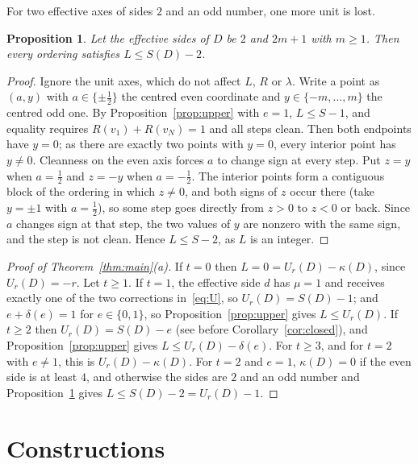 \documentclass[11pt]{article}
\newtheorem{proposition}{Proposition}
\theoremstyle{remark}
\begin{document}
For two effective axes of sides $2$ and an odd number, one more unit is lost.

\begin{proposition}\label{prop:narrow}
Let the effective sides of $D$ be $2$ and $2m+1$ with $m\ge1$. Then every
ordering satisfies $L\le S(D)-2$.
\end{proposition}

\begin{proof}
Ignore the unit axes, which do not affect $L$, $R$ or $\lambda$. Write a point
as $(a,y)$ with $a\in\{\pm\frac12\}$ the centred even coordinate and
$y\in\{-m,\dots,m\}$ the centred odd one. By Proposition~\ref{prop:upper}
with $e=1$, $L\le S-1$, and equality requires $R(v_1)+R(v_N)=1$ and all steps
clean. Then both endpoints have $y=0$; as there are exactly two points with
$y=0$, every interior point has $y\ne0$. Cleanness on the even axis forces $a$
to change sign at every step. Put $z=y$ when $a=\frac12$ and $z=-y$ when
$a=-\frac12$. The interior points form a contiguous block of the ordering in
which $z\ne0$, and both signs of $z$ occur there (take $y=\pm1$ with
$a=\frac12$), so some step goes directly from $z>0$ to $z<0$ or back. Since $a$
changes sign at that step, the two values of $y$ are nonzero with the same
sign, and the step is not clean. Hence $L\le S-2$, as $L$ is an integer.
\end{proof}

\begin{proof}[Proof of Theorem~\ref{thm:main}(a)]
If $t=0$ then $L=0=U_r(D)-\kappa(D)$, since $U_r(D)=-r$. Let $t\ge1$. If
$t=1$, the effective side $d$ has $\mu=1$ and receives exactly one of the two
corrections in~\eqref{eq:U}, so $U_r(D)=S(D)-1$; and $e+\delta(e)=1$ for
$e\in\{0,1\}$, so Proposition~\ref{prop:upper} gives $L\le U_r(D)$. If $t\ge2$
then $U_r(D)=S(D)-e$ (see before Corollary~\ref{cor:closed}), and
Proposition~\ref{prop:upper} gives $L\le U_r(D)-\delta(e)$. For $t\ge3$, and
for $t=2$ with $e\ne1$, this is $U_r(D)-\kappa(D)$. For $t=2$ and $e=1$,
$\kappa(D)=0$ if the even side is at least $4$, and otherwise the sides are
$2$ and an odd number and Proposition~\ref{prop:narrow} gives
$L\le S(D)-2=U_r(D)-1$.
\end{proof}

\section{Constructions}\label{sec:lower}
\end{document}
